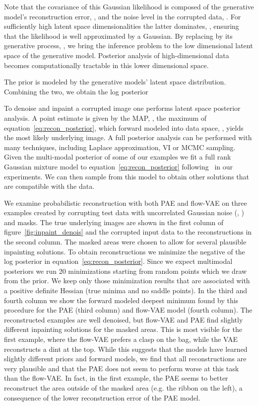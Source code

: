 \documentclass[10pt]{article} \usepackage[accepted]{tmlr}
\begin{document}
Note that the covariance of this Gaussian likelihood is composed of the generative model's reconstruction error, , and the noise level in the corrupted data, . For sufficiently high latent space dimensionalities the latter dominates, , ensuring that the likelihood is well approximated by a Gaussian. By replacing  by its generative process, , we bring the inference problem to the low dimensional latent space of the generative model. Posterior analysis of high-dimensional data becomes computationally tractable in this lower dimensional space.

The prior is modeled by the generative models' latent space distribution. Combining the two, we obtain the log posterior


To denoise and inpaint a corrupted image one performs latent space posterior analysis. A point estimate is given by the MAP, , the maximum of equation~\ref{eq:recon_posterior}, which forward modeled into data space, , yields the most likely underlying image. A full posterior analysis can be performed with many techniques, including Laplace approximation, VI or MCMC sampling. Given the multi-modal posterior of some of our examples we fit a full rank Gaussian mixture model to equation~\ref{eq:recon_posterior} following~\citep{SeljakYu19} in our experiments. We can then sample from this model to obtain other solutions that are compatible with the data. 

We examine probabilistic reconstruction with both PAE and flow-VAE on three examples created by corrupting test data with uncorrelated Gaussian noise (, ) and masks. The true underlying images are shown in the first column of figure~\ref{fig:inpaint_denois} and the corrupted input data to the reconstructions in the second column. The masked areas were chosen to allow for several plausible inpainting solutions. 
To obtain reconstructions we minimize the negative of the log posterior in equation~\ref{eq:recon_posterior}. Since we expect multimodal posteriors we run 20 minimizations starting from random points which we draw from the prior. We keep only those minimization results that are associated with a positive definite Hessian (true minima and no saddle points). In the third and fourth column we show the forward modeled deepest minimum found by this procedure for the PAE (third column) and flow-VAE model (fourth column). The reconstructed examples are well denoised, but flow-VAE and PAE find slightly different inpainting solutions for the masked areas. This is most visible for the first example, where the flow-VAE prefers a clasp on the bag, while the VAE reconstructs a dint at the top. While this suggests that the models have learned slightly different priors and forward models, we find that all reconstructions are very plausible and that the PAE does not seem to perform worse at this task than the flow-VAE. In fact, in the first example, the PAE seems to better reconstruct the area outside of the masked area (e.g. the ribbon on the left), a consequence of the lower reconstruction error of the PAE model.
\end{document}

